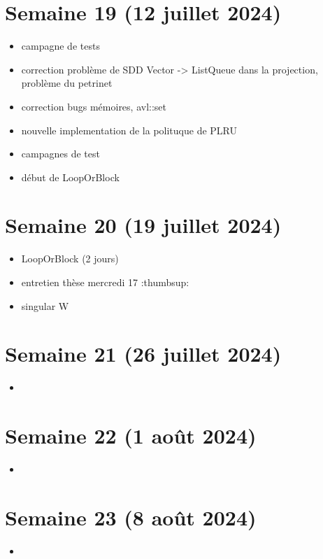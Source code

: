 \documentclass[a4paper,12pt]{article}
\begin{document}
\section{Semaine 19 (12 juillet 2024)}

\begin{itemize}
  \item campagne de tests
  \item correction problème de SDD Vector -> ListQueue dans la projection, problème du petrinet
  \item correction bugs mémoires, avl::set
  \item nouvelle implementation de la polituque de PLRU
  \item campagnes de test
  \item début de LoopOrBlock
\end{itemize}

\section{Semaine 20 (19 juillet 2024)}

\begin{itemize}
  \item LoopOrBlock (2 jours)
  \item entretien thèse mercredi 17 :thumbsup:
  \item singular W
\end{itemize}

\section{Semaine 21 (26 juillet 2024)}

\begin{itemize}
  \item ~
\end{itemize}

\section{Semaine 22 (1 août 2024)}

\begin{itemize}
  \item ~
\end{itemize}

\section{Semaine 23 (8 août 2024)}

\begin{itemize}
  \item ~
\end{itemize}
\end{document}

